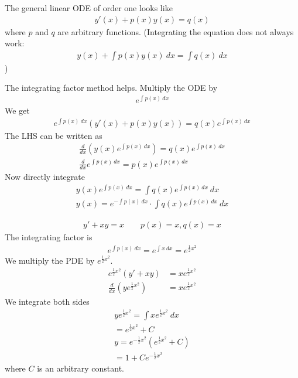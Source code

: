The general linear ODE of order one looks like
\begin{align*}
y'(x) + p(x) y(x) = q(x)
\end{align*}
where $p$ and $q$ are arbitrary functions.
(Integrating the equation does not always work:
\begin{align*}
y(x) + \int p(x) y(x)~dx = \int q(x)~dx
\end{align*}
)

The integrating factor method helps. Multiply the ODE by 
\begin{align*}
e^{\int p(x)~dx}
\end{align*}
We get
\begin{align*}
e^{\int p(x) ~dx} (y'(x) + p(x) y(x)) = q(x) e^{\int p(x) ~dx}
\end{align*}
The LHS can be written as
\begin{align*}
\frac d {dx} \left( y(x) e^{\int p(x)~dx} \right) = q(x) e^{\int p(x)~dx} \\
\frac d {dx} e^{\int p(x)~dx} = p(x) e^{\int p(x)~dx}
\end{align*}
Now directly integrate 
\begin{align*}
y(x) e^{\int p(x)~dx} = \int q(x) e^{\int p(x)~dx} ~dx \\
y(x) = e^{-\int p(x)~dx} \cdot \int q(x) e^{\int p(x)~dx} ~dx
\end{align*}
\begin{ex}
	\begin{align*}
	y' + xy = x \qquad p(x) = x, q(x) = x
	\end{align*}
	The integrating factor is 
	\begin{align*}
	e^{\int p(x)~dx} = e^{\int x~dx} = e^{\frac 1 2 x^2} 
	\end{align*}
	We multiply the PDE by $e^{\frac 1 2 x^2}$.
	\begin{align*}
	e^{\frac 1 2 x^2} (y'+xy) & = xe^{\frac 1 2 x^2} \\
	\frac d {dx} \left(y e^{\frac 1 2 x^2} \right) & = xe^{\frac 1 2 x^2}
	\end{align*}
	We integrate both sides
	\begin{align*}
	y e^{\frac 1 2 x^2} = \int x e^{\frac 1 2 x^2}~dx \\
	= e^{\frac 1 2 x^2} +C \\
	y = e^{-\frac 1 2 x^2}\left( e^{\frac 1 2 x^2} +C\right) \\
	= 1 + C e^{-\frac 1 2 x^2}
	\end{align*}
	where $C$ is an arbitrary constant.
\end{ex}


